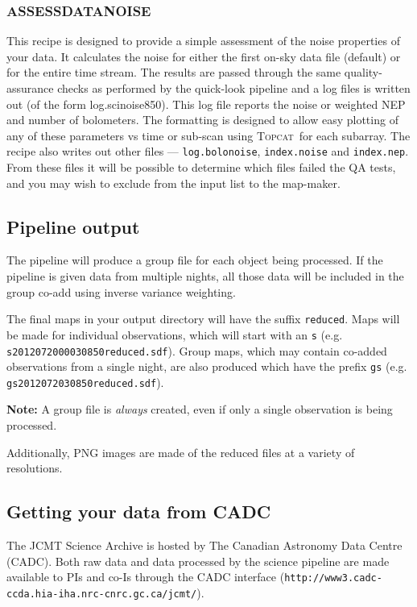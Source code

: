 \documentclass[twoside,11pt]{article}
\newcommand{\htmladdnormallink}[2]{#1}
\newcommand{\xlabel}[1]{}
\renewcommand{\_}{\texttt{\symbol{95}}}
\newcommand{\topcat}{\htmladdnormallink{\textsc{Topcat}}{http://www.starlink.ac.uk/topcat}}
\begin{document}
\subsubsection{\xlabel{assessnoise}ASSESS\_DATA\_NOISE}

This recipe is designed to provide a simple assessment of the noise
properties of your data. It calculates the noise for either the first
on-sky data file (default) or for the entire time stream. The results
are passed through the same quality-assurance checks as performed by
the quick-look pipeline and a log files is written out (of the form
log.scinoise850). This log file reports the noise or weighted NEP and
number of bolometers. The formatting is designed to allow easy
plotting of any of these parameters vs time or sub-scan using \topcat\
for each subarray. The recipe also writes out other files ---
\texttt{log.bolonoise}, \texttt{index.noise} and \texttt{index.nep}.
From these files it will be possible to determine which files failed
the QA tests, and you may wish to exclude from the input list to the
map-maker.

\subsection{\xlabel{pl_output}Pipeline output}

The pipeline will produce a group file for each object being
processed. If the pipeline is given data from multiple nights, all
those data will be included in the group co-add using inverse variance
weighting.

The final maps in your output directory will have the suffix
\texttt{\_reduced}. Maps will be made for individual observations,
which will start with an \texttt{s} (e.g.
\texttt{s20120720\_00030\_850\_reduced.sdf}). Group maps, which may contain
co-added observations from a single night, are also produced which
have the prefix \texttt{gs} (e.g. \texttt{gs20120720\_30\_850\_reduced.sdf}).

\textbf{Note:} A group file is \emph{always} created, even if only a single
observation is being processed.

Additionally, PNG images are made of the reduced files at a variety of
resolutions.

\subsection{\xlabel{cadc}Getting your data from CADC}

The JCMT Science Archive is hosted by The Canadian Astronomy Data
Centre (CADC). Both raw data and data processed by the science pipeline
are made available to PIs and co-Is through the CADC interface
(\texttt{http://www3.cadc-ccda.hia-iha.nrc-cnrc.gc.ca/jcmt/}).
\end{document}
